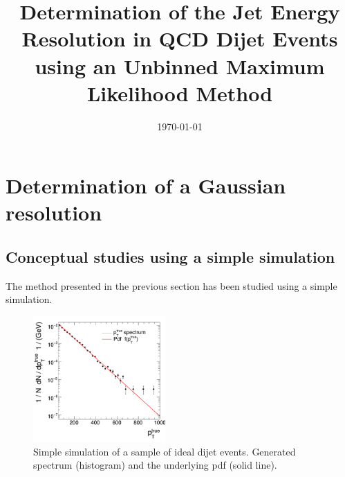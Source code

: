 \documentclass[a4paper]{cmspaper} %
\begin{document}
\begin{titlepage}
  \date{\today}
  \title{Determination of the Jet Energy Resolution in QCD Dijet
    Events using an Unbinned Maximum Likelihood Method}
\end{titlepage}
\tableofcontents










\section{Determination of a Gaussian resolution}
\subsection{Conceptual studies using a simple simulation}
The method presented in the previous section has been studied using a
simple simulation.

\begin{figure}[ht]
  \begin{center}
     \includegraphics[width=0.45\textwidth]{figures/resFit_ToyMC_PtGenCuts_SpectrumLog}
   \end{center}
   \caption{Simple simulation of a sample of ideal dijet events.
     Generated \pttrue spectrum (histogram) and the underlying pdf (solid line).}
   \label{fig:resFit:toyMC:ptGenCuts:spectrum}
\end{figure}
\end{document}

